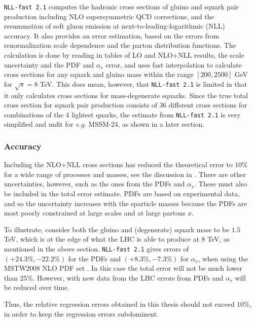 \documentclass[twoside,english]{uiofysmaster}
\begin{document}
\verb|NLL-fast 2.1| \cite{beenakker1997squark, kulesza2009threshold, kulesza2009soft, beenakker2009soft, beenakker2011squark} computes the hadronic cross sections of gluino and squark pair production including NLO supersymmetric QCD corrections, and the resummation of soft gluon emission at next-to-leading-logarithmic (NLL) accuracy. It also provides an error estimation, based on the errors from renormalization scale dependence and the parton distribution functions. The calculation is done by reading in tables of LO and NLO+NLL results, the scale uncertainty and the PDF and $\alpha_s$ error, and uses fast interpolation to calculate cross sections for any squark and gluino mass within the range $[200, 2500]$ GeV for $\sqrt{s}=8$ TeV. This does mean, however, that \verb|NLL-fast 2.1| is limited in that it only calculates cross sections for mass-degenerate squarks. Since the true total cross section for squark pair production consists of 36 different cross sections for combinations of the 4 lightest quarks, the estimate from \verb|NLL-fast 2.1| is very simplified and unfit for \textit{e.g.} MSSM-24, as shown in a later section.

\subsubsection{Accuracy}

Including the NLO+NLL cross sections has reduced the theoretical error to $10 \%$ for a wide range of processes and masses, see the discussion in \cite{balazs2017colliderbit}. There are other uncertainties, however, such as the ones from the PDFs and $\alpha_s$. These must also be included in the total error estimate. PDFs are based on experimental data, and so the uncertainty increases with the sparticle masses because the PDFs are most poorly constrained at large scales and at large partons $x$.

To illustrate, consider both the gluino and (degenerate) squark mass to be $1.5$ TeV, which is at the edge of what the LHC is able to produce at 8 TeV, as mentioned in the above section. \verb|NLL-fast 2.1| gives errors of $(+24.3 \%, -22.2\%)$ for the PDFs and $(+8.3 \%, -7.3 \%)$ for $\alpha_s$, when using the MSTW2008 NLO PDF
set \cite{Martin:2009iq}. In this case the total error will not be much lower than $25 \%$. However, with new data from the LHC errors from PDFs and $\alpha_s$ will be reduced over time.

Thus, the relative regression errors obtained in this thesis should not exceed $10 \%$, in order to keep the regression errors subdominent.
\end{document}
